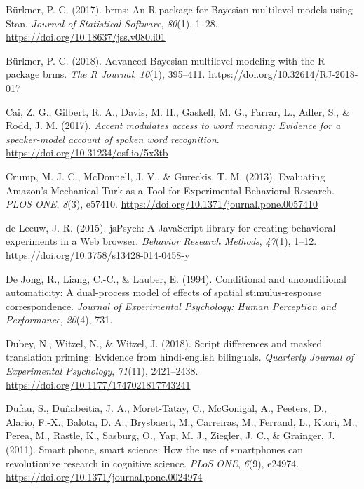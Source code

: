 \documentclass[
  english,
  man,floatsintext]{apa6}
\newlength{\cslhangindent}
\newlength{\cslentryspacingunit} %
\newenvironment{CSLReferences}[2] %
 {%
  \setlength{\parindent}{0pt}
  \ifodd #1
  \let\oldpar\par
  \def\par{\hangindent=\cslhangindent\oldpar}
  \fi
  \setlength{\parskip}{#2\cslentryspacingunit}
 }%
 {}
\begin{document}
\begin{CSLReferences}{1}{0}
\leavevmode{}%
Bürkner, P.-C. (2017). {brms}: An {R} package for {Bayesian} multilevel models using {Stan}. \emph{Journal of Statistical Software}, \emph{80}(1), 1--28. \url{https://doi.org/10.18637/jss.v080.i01}

\leavevmode{}%
Bürkner, P.-C. (2018). Advanced {Bayesian} multilevel modeling with the {R} package {brms}. \emph{The R Journal}, \emph{10}(1), 395--411. \url{https://doi.org/10.32614/RJ-2018-017}

\leavevmode{}%
Cai, Z. G., Gilbert, R. A., Davis, M. H., Gaskell, M. G., Farrar, L., Adler, S., \& Rodd, J. M. (2017). \emph{Accent modulates access to word meaning: Evidence for a speaker-model account of spoken word recognition}. \url{https://doi.org/10.31234/osf.io/5x3tb}

\leavevmode{}%
Crump, M. J. C., McDonnell, J. V., \& Gureckis, T. M. (2013). Evaluating Amazon's Mechanical Turk as a Tool for Experimental Behavioral Research. \emph{PLOS ONE}, \emph{8}(3), e57410. \url{https://doi.org/10.1371/journal.pone.0057410}

\leavevmode{}%
de Leeuw, J. R. (2015). jsPsych: A JavaScript library for creating behavioral experiments in a Web browser. \emph{Behavior Research Methods}, \emph{47}(1), 1--12. \url{https://doi.org/10.3758/s13428-014-0458-y}

\leavevmode{}%
De Jong, R., Liang, C.-C., \& Lauber, E. (1994). Conditional and unconditional automaticity: A dual-process model of effects of spatial stimulus-response correspondence. \emph{Journal of Experimental Psychology: Human Perception and Performance}, \emph{20}(4), 731.

\leavevmode{}%
Dubey, N., Witzel, N., \& Witzel, J. (2018). Script differences and masked translation priming: Evidence from hindi-english bilinguals. \emph{Quarterly Journal of Experimental Psychology}, \emph{71}(11), 2421--2438. \url{https://doi.org/10.1177/1747021817743241}

\leavevmode{}%
Dufau, S., Duñabeitia, J. A., Moret-Tatay, C., McGonigal, A., Peeters, D., Alario, F.-X., Balota, D. A., Brysbaert, M., Carreiras, M., Ferrand, L., Ktori, M., Perea, M., Rastle, K., Sasburg, O., Yap, M. J., Ziegler, J. C., \& Grainger, J. (2011). Smart phone, smart science: How the use of smartphones can revolutionize research in cognitive science. \emph{{PLoS} {ONE}}, \emph{6}(9), e24974. \url{https://doi.org/10.1371/journal.pone.0024974}


\end{CSLReferences}
\end{document}
